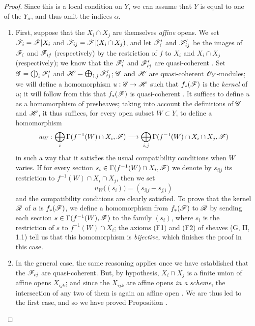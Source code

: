 \begin{proof}
\label{proof-1.9.2.1}
Since this is a local condition on $Y$, we can assume that $Y$ is equal to one
of the $Y_\alpha$, and thus omit the indices $\alpha$.
\begin{enumerate}[label=(\alph*)]
  \item First, suppose that the $X_i\cap X_j$
    are themselves \emph{affine} opens. We set $\mathscr{F}_i=\mathscr{F}|X_i$ and
    $\mathscr{F}_{ij}=\mathscr{F}|(X_i\cap X_j)$, and let $\mathscr{F}'_i$ and
    $\mathscr{F}'_{ij}$ be the images of $\mathscr{F}_i$ and $\mathscr{F}_{ij}$
    (respectively) by the restriction of $f$ to $X_i$ and $X_i\cap X_j$
    (respectively); we know that the $\mathscr{F}'_i$ and $\mathscr{F}'_{ij}$ are
    quasi-coherent . Set $\mathscr{G}=\bigoplus_i\mathscr{F}'_i$ and
    $\mathscr{H}=\bigoplus_{i,j}\mathscr{F}'_{ij}$; $\mathscr{G}$ and $\mathscr{H}$ are
    quasi-coherent $\mathscr{O}_Y$-modules; we will define a homomorphism
    $u:\sh{G}\to\sh{H}$ such that $f_*(\mathscr{F})$ is the
    \emph{kernel} of $u$; it will follow from this that $f_*(\mathscr{F})$ is
    quasi-coherent . It suffices to define $u$ as
    a homomorphism of presheaves; taking into account the definitions of $\mathscr{G}$
    and $\mathscr{H}$, it thus suffices, for every open subset $W\subset Y$, to define a
    homomorphism
    \[
      u_W:\bigoplus_i\Gamma(f^{-1}(W)\cap X_i,\sh{F})\to\bigoplus_{i,j}\Gamma(f^{-1}(W)\cap X_i\cap X_j,\sh{F})
    \]
    in such a way that it satisfies the usual compatibility conditions when $W$ varies.
    If for every section $s_i\in\Gamma(f^{-1}(W)\cap X_i,\mathscr{F})$ we denote by $s_{i|j}$ its restriction to $f^{-1}(W)\cap X_i\cap X_j$, then we set
    \[
      u_W\big((s_i)\big)=(s_{i|j}-s_{j|i})
    \]
    and the compatibility conditions are clearly satisfied.
    To prove that the kernel $\mathscr{R}$ of $u$ is $f_*(\mathscr{F})$, we define a homomorphism from $f_*(\mathscr{F})$ to $\mathscr{R}$ by sending each section $s\in\Gamma(f^{-1}(W),\mathscr{F})$ to the family $(s_i)$, where $s_i$ is the restriction of $s$ to $f^{-1}(W)\cap X_i$; the axioms (F1) and (F2) of sheaves (G, II, 1.1) tell us that this homomorphism is \emph{bijective}, which finishes the proof in this case.
  \item In the general case, the same reasoning applies once we have established that the $\mathscr{F}_{ij}$ are quasi-coherent.
    But, by hypothesis, $X_i\cap X_j$ is a finite union of affine opens $X_{ijk}$; and since the $X_{ijk}$ are affine opens \emph{in a scheme}, the intersection of any two of them is again an affine open . We are thus led to the first case, and so we have proved Proposition .
\end{enumerate}
\end{proof}

